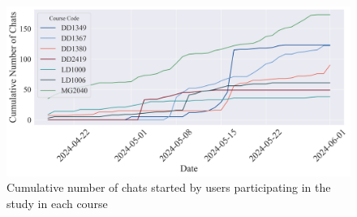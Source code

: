 \begin{figure}[H]
    \centering
    \includegraphics[width=1\textwidth]{results/plots/assets/usage-02-cumulative-number-of-chats-per-course.png}
    \caption{Cumulative number of chats started by users participating in the study in each course}
    \label{fig:usage_02_cumulative_number_of_chats_per_course}
\end{figure}